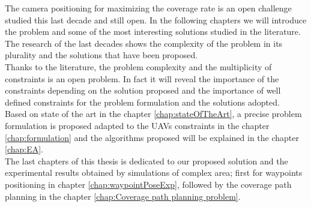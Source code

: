 The camera positioning for maximizing  the coverage rate is an open challenge studied this last decade and still open. 
In the following chapters we will introduce the problem and some of the most interesting solutions studied in the literature.
The research of the last decades  shows the complexity of the problem in its plurality and the solutions that have been proposed.\\
Thanks to the literature, the problem complexity and the multiplicity of constraints is an open problem. In fact it will reveal the importance of the constraints depending on the solution proposed and the importance of well defined constraints for the problem formulation and the solutions adopted. \\
Based on state of the art  in the chapter \ref{chap:stateOfTheArt}, a precise problem formulation is proposed adapted to the UAVs constraints in the chapter \ref{chap:formulation} and the algorithms proposed  will be explained  in the chapter \ref{chap:EA}. \\
The last chapters of this thesis is dedicated to our proposed solution and the experimental results obtained by simulations of complex area; first for waypoints positioning in chapter \ref{chap:waypointPoseExp}, followed by the coverage path planning in the chapter \ref{chap:Coverage path planning problem}.
 


